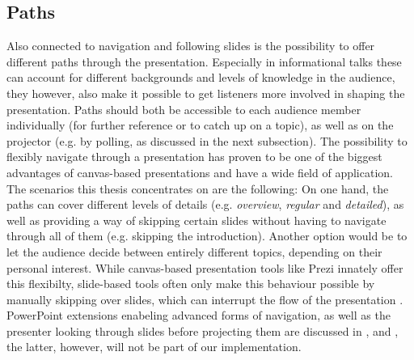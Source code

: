 \subsection{Paths}
Also connected to navigation and following slides is the possibility to offer different paths through the presentation. Especially in informational talks these can account for different backgrounds and levels of knowledge in the audience, they however, also make it possible to get listeners more involved in shaping the presentation. Paths should both be accessible to each audience member individually (for further reference or to catch up on a topic), as well as on the projector (e.g. by polling, as discussed in the next subsection).
The possibility to flexibly navigate through a presentation has proven to be one of the biggest advantages of canvas-based presentations \cite{Lichtschlag:CanvasPresentationsInTheWild} and have a wide field of application. The scenarios this thesis concentrates on are the following: On one hand, the paths can cover different levels of details (e.g. \emph{overview}, \emph{regular} and \emph{detailed}), as well as providing a way of skipping certain slides without having to navigate through all of them (e.g. skipping the introduction). Another option would be to let the audience decide between entirely different topics, depending on their personal interest. While canvas-based presentation tools like Prezi innately offer this flexibilty, slide-based tools often only make this behaviour possible by manually skipping over slides, which can interrupt the flow of the presentation \cite{Dieberger:NarrativeFlow}. PowerPoint extensions enabeling advanced forms of navigation, as well as the presenter looking through slides before projecting them are discussed in \cite{Dieberger:NarrativeFlow}, \cite{Nelson:PalettePaperInterface} and \cite{Signer:PaperPoint}, the latter, however, will not be part of our implementation.

